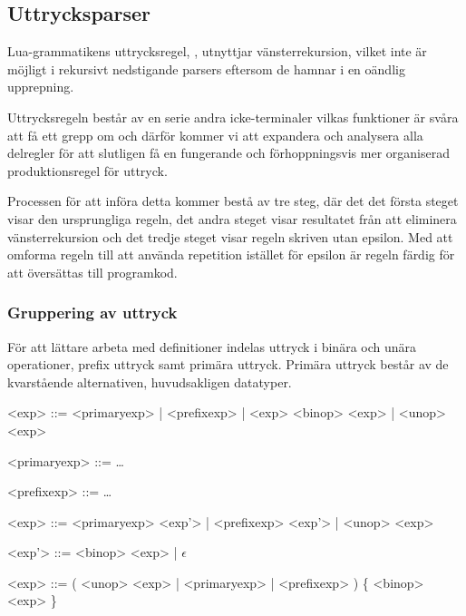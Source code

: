 \subsection{Uttrycksparser}

Lua-grammatikens uttrycksregel, , utnyttjar vänsterrekursion,
vilket inte är möjligt i rekursivt nedstigande parsers eftersom de hamnar i en
oändlig upprepning.

Uttrycksregeln består av en serie andra icke-terminaler vilkas funktioner är
svåra att få ett grepp om och därför kommer vi att expandera och analysera
alla delregler för att slutligen få en fungerande och förhoppningsvis mer
organiserad produktionsregel för uttryck.

Processen för att införa detta kommer bestå av tre steg, där det det första
steget visar den ursprungliga regeln, det andra steget visar resultatet från
att eliminera vänsterrekursion och det tredje steget visar regeln skriven utan epsilon.
Med att omforma regeln till att använda repetition istället för epsilon är
regeln färdig för att översättas till programkod.

\subsubsection{Gruppering av uttryck}

För att lättare arbeta med definitioner indelas uttryck i binära och unära
operationer, prefix uttryck samt primära uttryck. Primära uttryck består av de
kvarstående alternativen, huvudsakligen datatyper.

\begin{description}
  \setlength{\grammarindent}{5em}
  \item[Ursprungsregel] \hfill
    \begin{grammar}
      \singlespace\small%
      \selectfont
      <exp> ::= <primaryexp> | <prefixexp> | <exp> <binop> <exp> | <unop> <exp>

      <primaryexp> ::= \ldots

      <prefixexp> ::= \ldots
    \end{grammar}

  \item[Eliminering av vänsterrekursion] \hfill
    \begin{grammar}
      \singlespace\small%
      \selectfont
      <exp> ::= <primaryexp> <exp'> | <prefixexp> <exp'> | <unop> <exp>

      <exp'> ::= <binop> <exp> | $\epsilon$
    \end{grammar}

  \item[Resultat] \hfill
    \begin{grammar}
      \singlespace\small%
      \selectfont
      <exp> ::= ( <unop> <exp> | <primaryexp> | <prefixexp> ) \{ <binop> <exp> \}
    \end{grammar}
\end{description}

